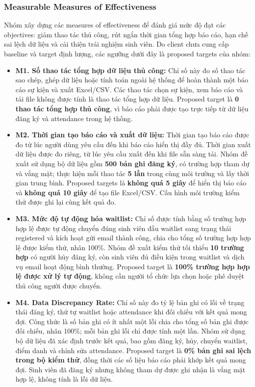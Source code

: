 \subsubsection{Measurable Measures of Effectiveness}

Nhóm xây dựng các measures of effectiveness để đánh giá mức độ đạt các objectives: giảm thao tác thủ công, rút ngắn thời gian tổng hợp báo cáo, hạn chế sai lệch dữ liệu và cải thiện trải nghiệm sinh viên. Do client chưa cung cấp baseline và target định lượng, các ngưỡng dưới đây là proposed targets của nhóm:

\begin{itemize}
\item \textbf{M1. Số thao tác tổng hợp dữ liệu thủ công:} Chỉ số này đo số thao tác sao chép, ghép dữ liệu hoặc tính toán ngoài hệ thống để hoàn thành một báo cáo sự kiện và xuất Excel/CSV. Các thao tác chọn sự kiện, xem báo cáo và tải file không được tính là thao tác tổng hợp dữ liệu. Proposed target là \textbf{0 thao tác tổng hợp thủ công}, vì báo cáo phải được tạo trực tiếp từ dữ liệu đăng ký và attendance trong hệ thống.

\item \textbf{M2. Thời gian tạo báo cáo và xuất dữ liệu:} Thời gian tạo báo cáo được đo từ lúc người dùng yêu cầu đến khi báo cáo hiển thị đầy đủ. Thời gian xuất dữ liệu được đo riêng, từ lúc yêu cầu xuất đến khi file sẵn sàng tải. Nhóm đề xuất sử dụng bộ dữ liệu gồm \textbf{500 bản ghi đăng ký}, có trường hợp tham dự và vắng mặt; thực hiện mỗi thao tác \textbf{5 lần} trong cùng môi trường và lấy thời gian trung bình. Proposed targets là \textbf{không quá 5 giây} để hiển thị báo cáo và \textbf{không quá 10 giây} để tạo file Excel/CSV. Cấu hình môi trường kiểm thử được ghi lại cùng kết quả đo.

\item \textbf{M3. Mức độ tự động hóa waitlist:} Chỉ số được tính bằng số trường hợp hợp lệ được tự động chuyển đúng sinh viên đầu waitlist sang trạng thái registered và kích hoạt gửi email thành công, chia cho tổng số trường hợp hợp lệ được kiểm thử, nhân 100\%. Nhóm đề xuất kiểm thử tối thiểu \textbf{10 trường hợp} có người hủy đăng ký, còn sinh viên đủ điều kiện trong waitlist và dịch vụ email hoạt động bình thường. Proposed target là \textbf{100\% trường hợp hợp lệ được xử lý tự động}, không cần người tổ chức lựa chọn hoặc phê duyệt thủ công người được chuyển.

\item \textbf{M4. Data Discrepancy Rate:} Chỉ số này đo tỷ lệ bản ghi có lỗi về trạng thái đăng ký, thứ tự waitlist hoặc attendance khi đối chiếu với kết quả mong đợi. Công thức là số bản ghi có ít nhất một lỗi chia cho tổng số bản ghi được đối chiếu, nhân 100\%; mỗi bản ghi lỗi chỉ được tính một lần. Nhóm sử dụng bộ dữ liệu đã xác định trước kết quả, bao gồm đăng ký, hủy, chuyển waitlist, điểm danh và chỉnh sửa attendance. Proposed target là \textbf{0\% bản ghi sai lệch trong bộ kiểm thử}, đồng thời các số liệu báo cáo phải khớp kết quả mong đợi. Sinh viên đã đăng ký nhưng không tham dự được ghi nhận là vắng mặt hợp lệ, không tính là lỗi dữ liệu.


\end{itemize}
